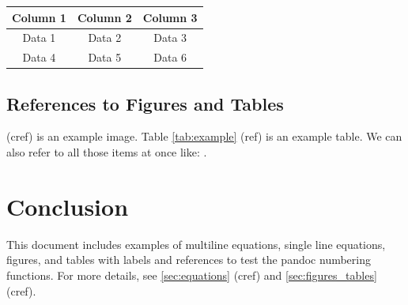 \documentclass{article}
\begin{document}
\begin{table}[H]
    \centering
    \begin{tabular}{|c|c|c|}
        \hline
        Column 1 & Column 2 & Column 3 \\
        \hline
        Data 1 & Data 2 & Data 3 \\
        Data 4 & Data 5 & Data 6 \\
        \hline
    \end{tabular}
\end{table}

\subsection{References to Figures and Tables}
 (cref) is an example image. Table \ref{tab:example} (ref) is an example table. We can also refer to all those items at once like: .

\section{Conclusion}
This document includes examples of multiline equations, single line equations, figures, and tables with labels and references to test the pandoc numbering functions. For more details, see \cref{sec:equations} (cref) and \cref{sec:figures_tables} (cref).

\listoffigures

\listoftables
\end{document}
